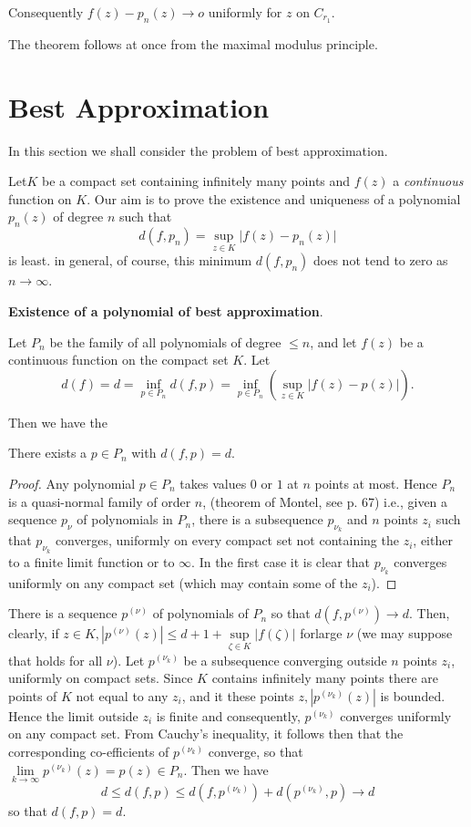 Consequently $f(z) - p_n (z) \to o$ uniformly for $z$ on $C_{r_1}$.
 
The theorem follows at once from the maximal modulus principle.
 
\section{Best Approximation}

 In this section we shall consider the problem  of best approximation. 
 
Let\pageoriginale $K$ be a  compact set containing infinitely many points and $f(z)$
a \textit{continuous} function on $K$. Our aim is to prove the
existence and uniqueness of a polynomial $p_n(z)$ of degree  $n$ such
that  
 $$
 d(f,p_n) = \sup_{z \in K} \bigg | f(z) - p_n (z) \bigg |
 $$
 is least. in general, of course, this  minimum $d(f,p_n)$ does not
 tend to zero as $n \to \infty$. 
 
 \noindent
 \textbf{Existence of a polynomial of best approximation}.
 
 Let $P_n$ be the family of all polynomials of degree  $\le n$, and
 let $f(z)$ be a continuous function on the compact set $K$. Let  
 $$
 d(f) = d = \inf_{p \in P_n} d(f,p) = \inf_{p \in P_n} (\sup_{z \in K}
 | f(z) - p(z) |). 
 $$
 
 Then we  have the 
 \begin{Thm*}[{\bf D}] %
   There exists a $p \in  P_n$ with $d(f,p) =d$.
 \end{Thm*} 

\begin{proof}
  Any polynomial $p \in P_n$ takes values  $0$ or $1$ at $n$ points at
  most. Hence $P_n$ is a quasi-normal family of order $n$, (theorem
  of Montel, see \cite{1} p. 67) i.e., given a sequence $p_\nu$ of
  polynomials in $P_n$, there is a subsequence $p_{\nu_k}$ and $n$
  points $z_i$ such that $p_{\nu_k}$ converges, uniformly on every
  compact set not containing the $z_i$, either to a finite limit
  function or to $\infty$. In the first case it is clear that
  $p_{\nu_k}$ converges uniformly on any compact set (which may
  contain some   of the $z_i$). 
\end{proof} 
 
 There is a sequence $p^{(\nu)}$ of polynomials of $P_n$ so that
 $d(f,p^{(\nu)}) \to d$. Then, clearly, if $z \in  K, |p^{(\nu)} (z) |
 \le d+1+ \sup\limits_{\zeta \in K}| f(\zeta)|$ for\pageoriginale large $\nu$ (we  may
 suppose that holds for all $\nu$). Let  $p^{(\nu_k)}$ be a
 subsequence converging outside $n$ points $z_i$, uniformly on compact
 sets. Since $K$ contains infinitely many points there are points of
 $K$ not equal to any $z_i$, and it these points  $z,|p^{(\nu_k)}(z)
 |$ is bounded. Hence the limit outside $z_i$ is finite and
 consequently, $p^{(\nu_k)}$ converges uniformly on any compact
 set. From Cauchy's inequality, it follows then that the  corresponding
 co-efficients of $ p^{(\nu_k)}$ converge, so that  $\lim\limits_{k
   \to \infty} p^{(\nu_k)} (z) = p(z) \in  P_n$. Then we have  
 $$
 d \le d(f,p) \le d(f,p^{(\nu_k)}) + d(p^{(\nu_k)}, p) \to d
 $$ 
 so that $d(f,p)=d$.
 
